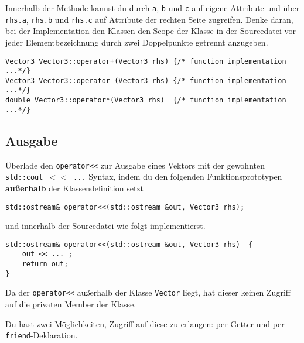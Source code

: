 Innerhalb der Methode kannst du durch \texttt{a}, \texttt{b} und \texttt{c} auf eigene Attribute und über  \texttt{rhs.a}, \texttt{rhs.b} und \texttt{rhs.c} auf Attribute der rechten Seite zugreifen. Denke daran, bei der Implementation den Klassen den Scope der Klasse in der Sourcedatei vor jeder Elementbezeichnung durch zwei Doppelpunkte getrennt anzugeben.

\begin{lstlisting}
Vector3 Vector3::operator+(Vector3 rhs) {/* function implementation ...*/}
Vector3 Vector3::operator-(Vector3 rhs) {/* function implementation ...*/}
double Vector3::operator*(Vector3 rhs)  {/* function implementation ...*/}
\end{lstlisting}


\subsection{Ausgabe}
Überlade den \texttt{operator<<} zur Ausgabe eines Vektors mit der gewohnten \texttt{std::cout $<<$ ...} Syntax, indem du den folgenden Funktionsprototypen \textbf{außerhalb} der Klassendefinition setzt

\begin{lstlisting}
std::ostream& operator<<(std::ostream &out, Vector3 rhs);
\end{lstlisting}

und innerhalb der Sourcedatei wie folgt implementierst.

\begin{lstlisting}
std::ostream& operator<<(std::ostream &out, Vector3 rhs)  {
	out << ... ;
	return out;
}
\end{lstlisting}

Da der \texttt{operator<<} außerhalb der Klasse \texttt{Vector} liegt, hat dieser keinen Zugriff auf die privaten Member der Klasse.

Du hast zwei Möglichkeiten, Zugriff auf diese zu erlangen: per Getter und per \texttt{friend}-Deklaration.


